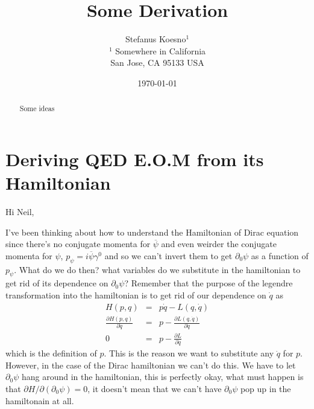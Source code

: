 \documentclass[aps,preprint,preprintnumbers,nofootinbib,showpacs,prd]{revtex4-1}
\newcommand{\nbea}{\begin{eqnarray*}}
\newcommand{\neea}{\end{eqnarray*}}
\begin{document}
\title{Some Derivation}
\bigskip
\author{Stefanus Koesno$^1$\\
$^1$ Somewhere in California\\ San Jose, CA 95133 USA\\
}
%
\date{\today}
%
\begin{abstract}
Some ideas

\end{abstract}
%
\maketitle

\section{Deriving QED E.O.M from its Hamiltonian}

\renewcommand{\theequation}{A.\arabic{equation}}  %
\setcounter{equation}{0}  %

Hi Neil,

I've been thinking about how to understand the Hamiltonian of Dirac equation since there's no conjugate momenta for $\overline \psi$ and even weirder the conjugate momenta for $\psi$, $p_\psi = i \overline\psi \gamma^0$ and so we can't invert them to get $\partial_0\psi$ as a function of $p_\psi$. What do we do then? what variables do we substitute in the hamiltonian to get rid of its dependence on $\partial_0 \psi$? Remember that the purpose of the legendre transformation into the hamiltonian is to get rid of our dependence on $\dot q$ as
%
\nbea
H(p,q) & = & p\dot q - L(q,\dot q) \\
\frac{\partial H(p,q)}{\partial \dot q} & = & p - \frac{\partial L(q,\dot q)}{\partial \dot q} \\
0 & = & p - \frac{\partial L}{\partial \dot q}
\neea
% 
which is the definition of $p$. This is the reason we want to substitute any $\dot q$ for $p$. However, in the case of the Dirac hamiltonian we can't do this. We have to let $\partial_0\psi$ hang around in the hamiltonian, this is perfectly okay, what must happen is that $\partial H/\partial (\partial_0 \psi) = 0$, it doesn't mean that we can't have $\partial_0\psi$ pop up in the hamiltonain at all.
\end{document}
